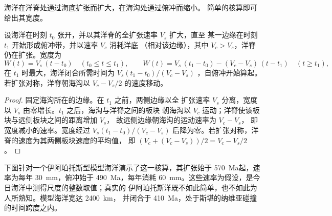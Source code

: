 海洋在洋脊处通过海底扩张而扩大，在海沟处通过俯冲而缩小。
简单的核算即可给出其宽度。

\begin{proposition}[一个旋回中海洋的宽度]\label{prop:b2:wilson-cycle:width}
设海洋在时刻 $t_0$ 张开，并以其洋脊的全扩张速率 $V_s$ 扩大，直至
某一边缘在时刻 $t_1$ 开始形成俯冲带，并以速率 $V_c$ 消耗洋底
（相对该边缘），其中 $V_c > V_s$，洋脊仍在扩张。宽度为
\[
  W(t) = V_s\,(t - t_0) \quad (t_0 \le t \le t_1), \qquad
  W(t) = V_s\,(t_1 - t_0) - (V_c - V_s)\,(t - t_1) \quad (t \ge t_1),
\]
在 $t_1$ 时最大，海洋闭合所需时间为 $V_s(t_1 - t_0)/(V_c - V_s)$
，自俯冲开始算起。若扩张对称，洋脊朝海沟以 $V_c - V_s/2$ 的速度移动。
\end{proposition}

\begin{proof}
固定海沟所在的边缘。在 $t_1$ 之前，两侧边缘以全
扩张速率 $V_s$ 分离，宽度以 $V_s$ 由零增长。$t_1$ 之后，海沟与洋脊之间的板块
朝海沟以 $V_c$ 运动；洋脊使该板块与远侧板块之间的距离增加 $V_s$，
故远侧边缘朝海沟的运动速率为 $V_c - V_s$，
即宽度减小的速率。宽度经过 $V_s(t_1 - t_0)/(V_c -
V_s)$ 后降为零。若扩张对称，洋脊的速度为其两侧板块速度的平均值，
即 $(V_c + (V_c - V_s))/2 = V_c - V_s/2$。
\end{proof}

下图针对一个伊阿珀托斯型模型海洋演示了这一核算，其扩张始于
\qty{570}{Ma}起，速率为每年 \qty{30}{mm}，俯冲始于 \qty{490}{Ma}，每年消耗
\qty{60}{mm}。这些速率为假设，是今日海洋中测得尺度的整数取值；真实的
伊阿珀托斯洋既不如此简单，也不如此为人所熟知。模型海洋宽达 \qty{2400}{km}，
并闭合于 \qty{410}{Ma}，处于斯堪的纳维亚碰撞的时间跨度之内。

